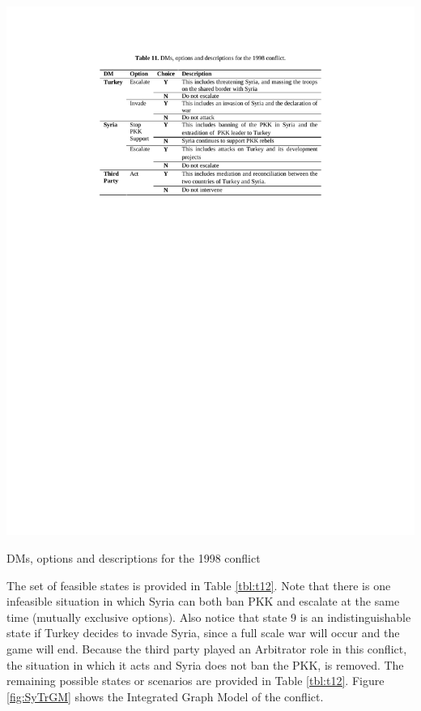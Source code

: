 \documentclass[letterpaper,12pt,titlepage,oneside,final]{book}
\begin{document}
\begin{table}[H]
\centering
\includegraphics[scale=1]{PDF-IMG/tables/11.pdf}

\caption{DMs, options and descriptions for the 1998 conflict}

\label{tbl:t11}
\end{table}

The set of feasible states is provided in Table \ref{tbl:t12}. Note that there is one infeasible situation in which Syria can both ban PKK and escalate at the same time (mutually exclusive options). Also notice that state 9 is an indistinguishable state if Turkey decides to invade Syria, since a full scale war will occur and the game will end.  Because the third party played an Arbitrator role in this conflict, the situation in which it acts and Syria does not ban the PKK, is removed. The remaining possible states or scenarios are provided in Table \ref{tbl:t12}. Figure \ref{fig:SyTrGM} shows the Integrated Graph Model of the conflict.
\end{document}
